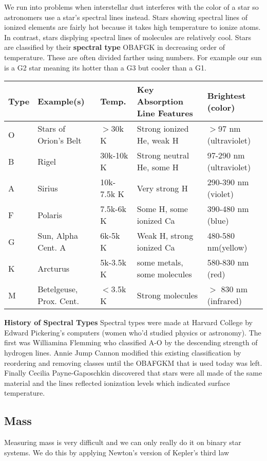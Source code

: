 We run into problems when interstellar dust interferes with the color of a star so astronomers use a star's spectral lines instead. Stars showing spectral lines of ionized elements are fairly hot because it takes high temperature to ionize atoms. In contrast, stars displying spectral lines of molecules are relatively cool. Stars are classified by their \textbf{spectral type} OBAFGK in decreasing order of temperature. These are often divided farther using numbers. For example our sun is a G2 star meaning its hotter than a G3 but cooler than a G1.

\begin{tabular}{|l|l|l|l|l|}
\hline
Type & Example(s) & Temp. & Key Absorption Line Features & Brightest (color) \\
\hline
O & Stars of Orion’s Belt & $>$30k K & Strong ionized He, weak H & $>$97 nm (ultraviolet) \\
\hline
B & Rigel & 30k-10k K & Strong neutral He, some H & 97-290 nm (ultraviolet) \\
\hline
A & Sirius & 10k-7.5k K & Very strong H & 290-390 nm (violet) \\
\hline
F & Polaris & 7.5k-6k K & Some H, some ionized Ca & 390-480 nm (blue) \\
\hline
G & Sun, Alpha Cent. A & 6k-5k K & Weak H, strong ionized Ca & 480-580 nm(yellow) \\
\hline
K & Arcturus & 5k-3.5k K & some metals, some molecules & 580-830 nm (red) \\
\hline
M & Betelgeuse, Prox. Cent. & $<$3.5k K & Strong molecules & $>$ 830 nm (infrared) \\
\hline
\end{tabular}

\textbf{History of Spectral Types}
Spectral types were made at Harvard College by Edward Pickering's computers (women who'd studied physics or astronomy). The first was Williamina Flemming who classified A-O by the descending strength of hydrogen lines. Annie Jump Cannon modified this existing classification by reordering and removing classes until the OBAFGKM that is used today was left. Finally Cecilia Payne-Gaposchkin discovered that stars were all made of the same material and the lines reflected ionization levels which indicated surface temperature.

\subsection{Mass}
Measuring mass is very difficult and we can only really do it on binary star systems. We do this by applying Newton's version of Kepler's third law


